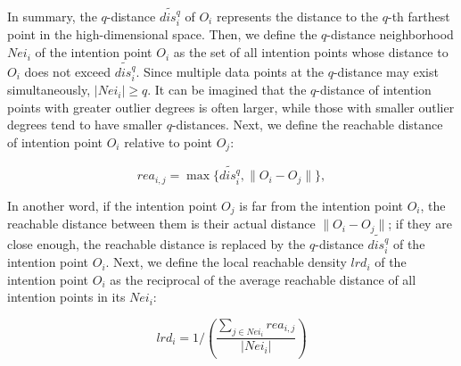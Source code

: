 \documentclass[lettersize,journal]{IEEEtran}
\begin{document}
In summary, the $q$-distance $\widetilde{dis_i^q}$ of $O_i$ represents the distance to the $q$-th farthest point in the high-dimensional space. Then, we define the $q$-distance neighborhood $Nei_i$ of the intention point $O_i$ as the set of all intention points whose distance to $O_i$ does not exceed $\widetilde{dis_i^q}$. Since multiple data points at the $q$-distance may exist simultaneously, $|Nei_i| \geq q$. It can be imagined that the $q$-distance of intention points with greater outlier degrees is often larger, while those with smaller outlier degrees tend to have smaller $q$-distances. Next, we define the reachable distance of intention point $O_i$ relative to point $O_j$:

\begin{equation}
rea_{i,j}=\max\{\widetilde{dis_i^q}, \|O_i-O_j\|\},
\end{equation}

In another word, if the intention point $O_j$ is far from the intention point $O_i$, the reachable distance between them is their actual distance $\|O_i-O_j\|$; if they are close enough, the reachable distance is replaced by the $q$-distance $\widetilde{dis_i^q}$ of the intention point $O_i$. Next, we define the local reachable density $lrd_i$ of the intention point $O_i$ as the reciprocal of the average reachable distance of all intention points in its $Nei_i$:

\begin{equation}
lrd_i=1/(\frac{\sum_{j\in Nei_i} rea_{i,j}}{|Nei_i|})
\end{equation}
\end{document}
